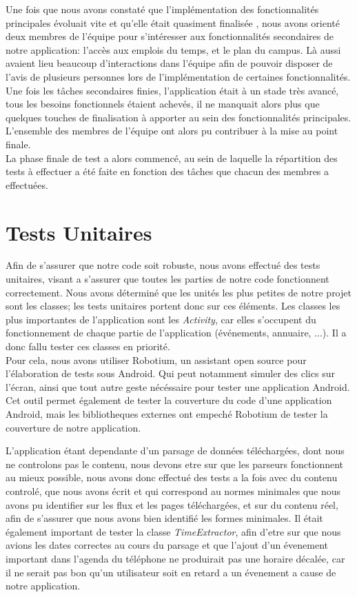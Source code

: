 Une fois que nous avons constaté que l’implémentation des fonctionnalités principales évoluait vite et qu’elle était quasiment finalisée , nous avons orienté deux membres de l’équipe pour s’intéresser aux fonctionnalités secondaires de notre application: l’accès aux emplois du temps, et le plan du campus. Là aussi avaient lieu beaucoup d'interactions dans l’équipe afin de pouvoir disposer de l’avis de plusieurs personnes lors de l’implémentation de certaines fonctionnalités.\\
Une fois les tâches secondaires finies, l’application était à un stade très avancé, tous les besoins fonctionnels  étaient achevés, il ne manquait alors plus que quelques touches de finalisation à apporter au sein des fonctionnalités principales. L’ensemble des membres de l’équipe ont alors pu contribuer à la mise au point finale.\\
La phase finale de test a alors commencé, au sein de laquelle la répartition des tests à effectuer a été faite en fonction des tâches que chacun des membres a effectuées.

\section{Tests Unitaires}
Afin de s'assurer que notre code soit robuste, nous avons effectué des tests unitaires, visant a s'assurer que toutes les parties de notre code fonctionnent correctement. Nous avons déterminé que les unités les plus petites de notre projet sont les classes; les tests unitaires portent donc sur ces éléments. Les classes les plus importantes de l’application sont les \emph{Activity}, car elles s’occupent du fonctionnement de chaque partie de l’application (événements, annuaire, ...). Il a donc fallu tester ces classes en priorité.\\

Pour cela, nous avons utiliser Robotium, un assistant open source pour l'élaboration de tests sous Android. Qui peut notamment simuler des clics sur l'écran, ainsi que tout autre geste nécéssaire pour tester une application Android.
Cet outil permet également de tester la couverture du code d'une application Android, mais les bibliotheques externes ont empeché Robotium de tester la couverture de notre application.

L'application étant dependante d'un parsage de données téléchargées, dont nous ne controlons pas le contenu, nous devons etre sur que les parseurs fonctionnent au mieux possible, nous avons donc effectué des tests a la fois avec du contenu controlé, que nous avons écrit et qui correspond au normes minimales que nous avons pu identifier sur les flux et les pages téléchargées, et sur du contenu réel, afin de s'assurer que nous avons bien identifié les formes minimales.
Il était également important de tester la classe \emph{TimeExtractor}, afin d'etre sur que nous avions les dates correctes au cours du parsage et que l'ajout d'un évenement important dans l'agenda du téléphone ne produirait pas une horaire décalée, car il ne serait pas bon qu'un utilisateur soit en retard a un évenement a cause de notre application.

